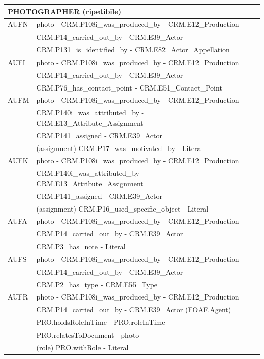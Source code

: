 \begin{center}
\begin{longtable}{ | p{1cm} | p{8cm} | p{3cm} | }
  \multicolumn{3}{|l|}{\cellcolor{lightcyan}PHOTOGRAPHER (ripetibile)}\\ \hline
  AUFN &  photo - CRM.P108i\_was\_produced\_by - CRM.E12\_Production & \\
   & CRM.P14\_carried\_out\_by - CRM.E39\_Actor & \\
   & CRM.P131\_is\_identified\_by - CRM.E82\_Actor\_Appellation & \\ \hline
  AUFI &  photo - CRM.P108i\_was\_produced\_by - CRM.E12\_Production & \\
   & CRM.P14\_carried\_out\_by - CRM.E39\_Actor & \\
   & CRM.P76\_has\_contact\_point - CRM.E51\_Contact\_Point & \\ \hline
  AUFM &  photo - CRM.P108i\_was\_produced\_by - CRM.E12\_Production & \\
   & CRM.P140i\_was\_attributed\_by - CRM.E13\_Attribute\_Assignment & \\
   & CRM.P141\_assigned - CRM.E39\_Actor & \\
   & (assignment) CRM.P17\_was\_motivated\_by - Literal & \\ \hline
  AUFK &  photo - CRM.P108i\_was\_produced\_by - CRM.E12\_Production & \\
   & CRM.P140i\_was\_attributed\_by - CRM.E13\_Attribute\_Assignment & \\
   & CRM.P141\_assigned - CRM.E39\_Actor & \\ 
   & (assignment) CRM.P16\_used\_specific\_object - Literal & \\ \hline
  AUFA &  photo - CRM.P108i\_was\_produced\_by - CRM.E12\_Production & \\
   & CRM.P14\_carried\_out\_by - CRM.E39\_Actor & \\
   & CRM.P3\_has\_note - Literal & \\ \hline
  AUFS &  photo - CRM.P108i\_was\_produced\_by - CRM.E12\_Production & \\
   & CRM.P14\_carried\_out\_by - CRM.E39\_Actor & \\
   & CRM.P2\_has\_type - CRM.E55\_Type & \\ \hline
  AUFR &  photo - CRM.P108i\_was\_produced\_by - CRM.E12\_Production & \\
   & CRM.P14\_carried\_out\_by - CRM.E39\_Actor (FOAF.Agent) & \\
   & PRO.holdsRoleInTime - PRO.roleInTime & \\
   & PRO.relatesToDocument - photo & \\
   & (role) PRO.withRole - Literal & \\ \hline
   

\end{longtable}
\end{center}
